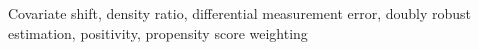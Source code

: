 Covariate shift, density ratio, differential measurement error, doubly robust estimation, positivity, propensity score weighting
